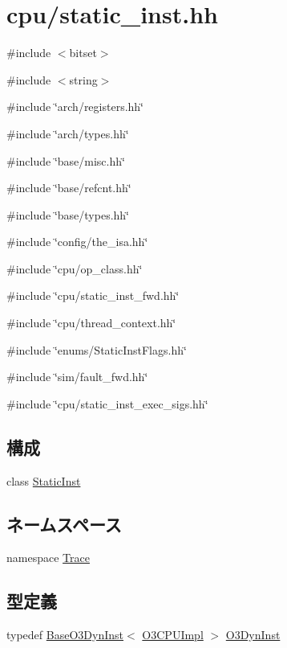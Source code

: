 \hypertarget{cpu_2static__inst_8hh}{
\section{cpu/static\_\-inst.hh}
\label{cpu_2static__inst_8hh}
}
{\ttfamily \#include $<$bitset$>$}\par
{\ttfamily \#include $<$string$>$}\par
{\ttfamily \#include \char`\"{}arch/registers.hh\char`\"{}}\par
{\ttfamily \#include \char`\"{}arch/types.hh\char`\"{}}\par
{\ttfamily \#include \char`\"{}base/misc.hh\char`\"{}}\par
{\ttfamily \#include \char`\"{}base/refcnt.hh\char`\"{}}\par
{\ttfamily \#include \char`\"{}base/types.hh\char`\"{}}\par
{\ttfamily \#include \char`\"{}config/the\_\-isa.hh\char`\"{}}\par
{\ttfamily \#include \char`\"{}cpu/op\_\-class.hh\char`\"{}}\par
{\ttfamily \#include \char`\"{}cpu/static\_\-inst\_\-fwd.hh\char`\"{}}\par
{\ttfamily \#include \char`\"{}cpu/thread\_\-context.hh\char`\"{}}\par
{\ttfamily \#include \char`\"{}enums/StaticInstFlags.hh\char`\"{}}\par
{\ttfamily \#include \char`\"{}sim/fault\_\-fwd.hh\char`\"{}}\par
{\ttfamily \#include \char`\"{}cpu/static\_\-inst\_\-exec\_\-sigs.hh\char`\"{}}\par
\subsection*{構成}
\begin{DoxyCompactItemize}
\item 
class \hyperlink{classStaticInst}{StaticInst}
\end{DoxyCompactItemize}
\subsection*{ネームスペース}
\begin{DoxyCompactItemize}
\item 
namespace \hyperlink{namespaceTrace}{Trace}
\end{DoxyCompactItemize}
\subsection*{型定義}
\begin{DoxyCompactItemize}
\item 
typedef \hyperlink{classBaseO3DynInst}{BaseO3DynInst}$<$ \hyperlink{structO3CPUImpl}{O3CPUImpl} $>$ \hyperlink{cpu_2static__inst_8hh_a091350ae6b1111b92f9a1174c552188f}{O3DynInst}
\end{DoxyCompactItemize}



